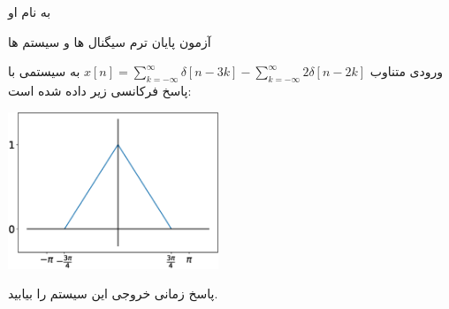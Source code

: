 \documentclass{article}
\begin{document}
\begin{center}
\large

به نام او

آزمون پایان ترم سیگنال ها و سیستم ها
\end{center}

\hrulefill

\large



ورودی متناوب 
$
x[n]=\sum_{k=-\infty}^\infty \delta[n-3k]-\sum_{k=-\infty}^\infty 2\delta[n-2k]
$
به سیستمی با پاسخ فرکانسی زیر داده شده است:
\begin{center}
\includegraphics[width=63mm]{final_h2.eps}
\end{center}

پاسخ زمانی خروجی این سیستم را بیابید.
\end{document}
